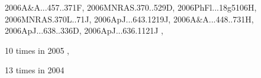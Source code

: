 \documentclass[12pt]{article}
\begin{document}
\begin{description}
{2006A&A...457..371F,%
2006MNRAS.370..529D,%
2006PhFl...18g5106H,%
2006MNRAS.370L..71J,%
2006ApJ...643.1219J,%
2006A&A...448..731H,%
2006ApJ...638..336D,%
2006ApJ...636.1121J%
},\item
10 times in 2005 \citep{
2005ApJ...634.1353J,%
2005PEPI..153..124M,%
2005AN....326..787B,%
2005PhR...417....1B,%
2005astro.ph..7313R,%
2005ApJ...625L.115S,%
2005ApJ...625..539B,%
2005ESASP.560..511D,%
2005prpl.conf.8004J,%
2005LNP...664..219B%
},\item
13 times in 2004 \citep{
2004ASPC..325..165N,%
2004AIPC..733..122B,%
2004A&A...427...13B,%
2004PhRvE..70c6408H,%
2004MNRAS.353..947H,%
}
\end{description}
\end{document}
